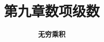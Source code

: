 


\title[数学分析]{\texorpdfstring{\LARGE \bfseries 第九章\quad 数项级数}{第九章 数项级数}} %
\author[无穷乘积] %
{\Large \bfseries 无穷乘积}
\date{}





\begin{frame}

\titlepage %

\end{frame}





